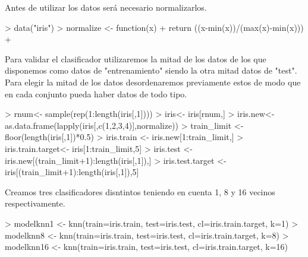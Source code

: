 \documentclass [a4paper] {article}
\begin{document}
Antes de utilizar los datos será necesario normalizarlos.
\begin{Schunk}
\begin{Sinput}
> data("iris")
> normalize <- function(x){
+   return ((x-min(x))/(max(x)-min(x)))
+ }
\end{Sinput}
\end{Schunk}

Para validar el clasificador utilizaremos la mitad de los datos de los que disponemos como datos de "entrenamiento" siendo la otra mitad datos de "test".
Para elegir la mitad de los datos desordenaremos previamente estos de modo que en cada conjunto pueda haber datos de todo tipo.
\begin{Schunk}
\begin{Sinput}
> rnum<- sample(rep(1:length(iris[,1])))
> iris<- iris[rnum,]
> iris.new<- as.data.frame(lapply(iris[,c(1,2,3,4)],normalize))
> train_limit <- floor(length(iris[,1])*0.5)
> iris.train <- iris.new[1:train_limit,]
> iris.train.target<- iris[1:train_limit,5]
> iris.test <- iris.new[(train_limit+1):length(iris[,1]),]
> iris.test.target <- iris[(train_limit+1):length(iris[,1]),5]
\end{Sinput}
\end{Schunk}

Creamos tres clasificadores disntintos teniendo en cuenta 1, 8 y 16 vecinos respectivamente.
\begin{Schunk}
\begin{Sinput}
> modelknn1 <- knn(train=iris.train, test=iris.test, cl=iris.train.target, k=1)
> modelknn8 <- knn(train=iris.train, test=iris.test, cl=iris.train.target, k=8)
> modelknn16 <- knn(train=iris.train, test=iris.test, cl=iris.train.target, k=16)
\end{Sinput}
\end{Schunk}
\end{document}
